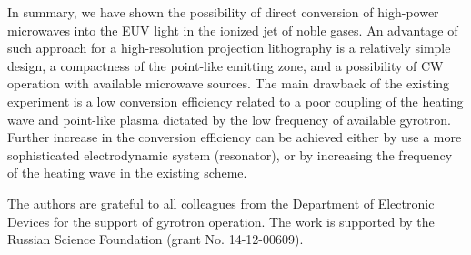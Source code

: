 \documentclass[aip, apl, amsmath,amssymb, reprint]{revtex4-1}
\begin{document}
In summary, we have shown the possibility of direct conversion of high-power microwaves into the EUV light in the ionized jet of noble gases. An advantage of such approach for a high-resolution projection lithography is a relatively simple design, a compactness of the point-like emitting zone, and a possibility of CW operation with available microwave sources. The main drawback of the existing experiment is a low conversion efficiency related to a poor coupling of the heating wave and point-like plasma dictated by the low frequency of available gyrotron.
Further increase in the conversion efficiency can be achieved either by use a more sophisticated electrodynamic system (resonator), or by increasing the frequency of the heating wave in the existing scheme. %




\vspace{6pt}
The authors are grateful to all colleagues from the Department of Electronic Devices for the support of gyrotron operation. 
The work is supported by the Russian Science Foundation (grant No. 14-12-00609).
\end{document}
